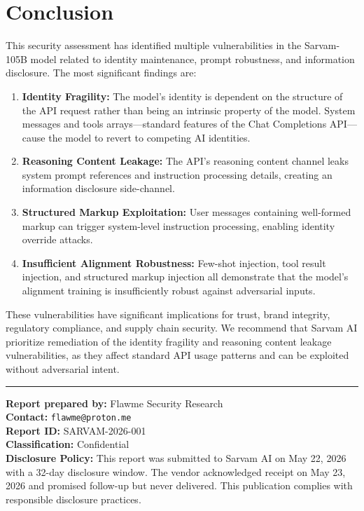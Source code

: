 \documentclass[11pt,a4paper]{article}
\begin{document}
\section{Conclusion}

This security assessment has identified multiple vulnerabilities in the Sarvam-105B model related to identity maintenance, prompt robustness, and information disclosure. The most significant findings are:

\begin{enumerate}[leftmargin=*]
    \item \textbf{Identity Fragility:} The model's identity is dependent on the structure of the API request rather than being an intrinsic property of the model. System messages and tools arrays---standard features of the Chat Completions API---cause the model to revert to competing AI identities.
    \item \textbf{Reasoning Content Leakage:} The API's reasoning content channel leaks system prompt references and instruction processing details, creating an information disclosure side-channel.
    \item \textbf{Structured Markup Exploitation:} User messages containing well-formed markup can trigger system-level instruction processing, enabling identity override attacks.
    \item \textbf{Insufficient Alignment Robustness:} Few-shot injection, tool result injection, and structured markup injection all demonstrate that the model's alignment training is insufficiently robust against adversarial inputs.
\end{enumerate}

\noindent These vulnerabilities have significant implications for trust, brand integrity, regulatory compliance, and supply chain security. We recommend that Sarvam AI prioritize remediation of the identity fragility and reasoning content leakage vulnerabilities, as they affect standard API usage patterns and can be exploited without adversarial intent.

\vspace{1cm}

\noindent\rule{\textwidth}{0.4pt}

\noindent\textbf{Report prepared by:} Flawme Security Research \\
\noindent\textbf{Contact:} \texttt{flawme@proton.me} \\
\noindent\textbf{Report ID:} SARVAM-2026-001 \\
\noindent\textbf{Classification:} Confidential \\
\noindent\textbf{Disclosure Policy:} This report was submitted to Sarvam AI on May 22, 2026 with a 32-day disclosure window. The vendor acknowledged receipt on May 23, 2026 and promised follow-up but never delivered. This publication complies with responsible disclosure practices.
\end{document}
